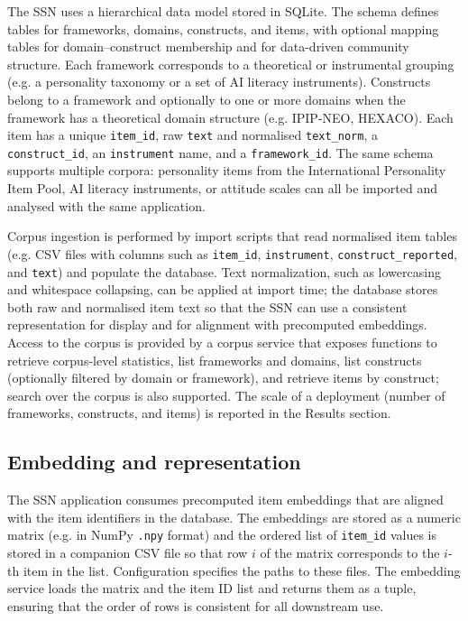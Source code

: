 \documentclass[11pt]{article}
\begin{document}
The SSN uses a hierarchical data model stored in SQLite. The schema defines tables for frameworks, domains, constructs, and items, with optional mapping tables for domain--construct membership and for data-driven community structure. Each framework corresponds to a theoretical or instrumental grouping (e.g. a personality taxonomy or a set of AI literacy instruments). Constructs belong to a framework and optionally to one or more domains when the framework has a theoretical domain structure (e.g. IPIP-NEO, HEXACO). Each item has a unique \texttt{item\_id}, raw \texttt{text} and normalised \texttt{text\_norm}, a \texttt{construct\_id}, an \texttt{instrument} name, and a \texttt{framework\_id}. The same schema supports multiple corpora: personality items from the International Personality Item Pool, AI literacy instruments, or attitude scales can all be imported and analysed with the same application.

Corpus ingestion is performed by import scripts that read normalised item tables (e.g. CSV files with columns such as \texttt{item\_id}, \texttt{instrument}, \texttt{construct\_reported}, and \texttt{text}) and populate the database. Text normalization, such as lowercasing and whitespace collapsing, can be applied at import time; the database stores both raw and normalised item text so that the SSN can use a consistent representation for display and for alignment with precomputed embeddings. Access to the corpus is provided by a corpus service that exposes functions to retrieve corpus-level statistics, list frameworks and domains, list constructs (optionally filtered by domain or framework), and retrieve items by construct; search over the corpus is also supported. The scale of a deployment (number of frameworks, constructs, and items) is reported in the Results section.

\subsection{Embedding and representation}

The SSN application consumes precomputed item embeddings that are aligned with the item identifiers in the database. The embeddings are stored as a numeric matrix (e.g. in NumPy \texttt{.npy} format) and the ordered list of \texttt{item\_id} values is stored in a companion CSV file so that row $i$ of the matrix corresponds to the $i$-th item in the list. Configuration specifies the paths to these files. The embedding service loads the matrix and the item ID list and returns them as a tuple, ensuring that the order of rows is consistent for all downstream use.
\end{document}
